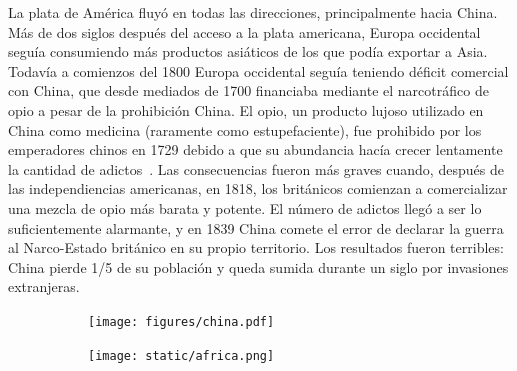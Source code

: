 \documentclass[a4paper,11pt]{book}
\theoremstyle{definition}
\newif\ifen
\newif\ifes
\newcommand{\en}[1]{\ifen#1\fi}
\newcommand{\es}[1]{\ifes#1\fi}
\begin{document}
La plata de Am\'erica fluy\'o en todas las direcciones, principalmente hacia China.
Más de dos siglos después del acceso a la plata americana, Europa occidental segu\'ia consumiendo más productos asi\'aticos de los que pod\'ia exportar a Asia.
Todavía a comienzos del 1800 Europa occidental seguía teniendo déficit comercial con China, que desde mediados de 1700 financiaba mediante el narcotráfico de opio a pesar de la prohibición China.
%
El opio, un producto lujoso utilizado en China como medicina (raramente como estupefaciente), fue prohibido por los emperadores chinos en 1729 debido a que su abundancia hac\'ia crecer lentamente la cantidad de adictos~\cite{pomeranz2018-tradeCreated}.
%
Las consecuencias fueron más graves cuando, después de las independiencias americanas, en 1818, los británicos comienzan a comercializar una mezcla de opio más barata y potente.
%
El número de adictos llegó a ser lo suficientemente alarmante, y en 1839 China comete el error de declarar la guerra al Narco-Estado británico en su propio territorio.
%
Los resultados fueron terribles: China pierde 1/5 de su población y queda sumida durante un siglo por invasiones extranjeras.

\begin{figure}[ht!]
\centering
 \begin{subfigure}[b]{0.45\textwidth} \centering
  \texttt{[image: figures/china.pdf]}
  \caption{}
  \label{fig:china}
  \end{subfigure}
  \begin{subfigure}[b]{0.27\textwidth} \centering
  \texttt{[image: static/africa.png]}
  \caption{}
  \label{fig:africa}
  \end{subfigure}
 \caption{
 \en{(\subref{fig:china}): China's defeat against the British narco-state on its own territory had terrible consequences. (\subref{fig:africa}): It was not until 1850 that the colonization of continental Africa and the vast territories of the still autonomous Americas began.}%
 \es{(\subref{fig:china}): La derrota de China contra el narco-estado británico en su propio territorio tuvo consecuencias terribles. (\subref{fig:africa}): Recién a partir de 1850 comienza la colonización de África continental y los extensos territorios de América todavía autónomos.}%
 }
 \label{fig:eraDeGenocidios}
 \end{figure}
\end{document}
